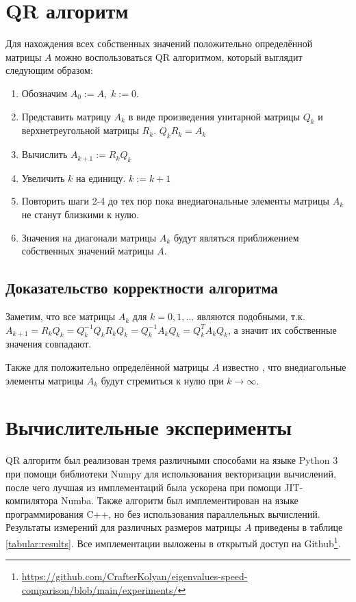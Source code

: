 \documentclass[12pt, fleqn]{article}
\begin{document}
\section{QR алгоритм}

Для нахождения всех собственных значений положительно определённой матрицы $A$ можно воспользоваться QR алгоритмом, который выглядит следующим образом:
\begin{enumerate}
	\item Обозначим $A_0 := A, \; k := 0$.
	\item Представить матрицу $A_k$ в виде произведения унитарной матрицы $Q_k$ и верхнетреугольной матрицы $R_k$. $Q_k R_k = A_k$
	\item Вычислить $A_{k+1} := R_k Q_k$
	\item Увеличить $k$ на единицу. $k := k + 1$
	\item Повторить шаги 2-4 до тех пор пока внедиагональные элементы матрицы $A_k$ не станут близкими к нулю.
	\item Значения на диагонали матрицы $A_k$ будут являться приближением собственных значений матрицы $A$.
\end{enumerate}

\subsection{Доказательство корректности алгоритма}
Заметим, что все матрицы $A_k$ для $k = 0, 1, \dots$ являются подобными, т.к. \\
$A_{k + 1} = R_k Q_k = Q_k^{-1} Q_k R_k Q_k = Q_k^{-1} A_k Q_k = Q_k^T A_k Q_k$, а значит их собственные значения совпадают.

Также для положительно определённой матрицы $A$ известно \cite{QR}, что внедиагольные элементы матрицы $A_k$ будут стремиться к нулю при $k \to \infty$.

\section{Вычислительные эксперименты}

QR алгоритм был реализован тремя различными способами на языке Python 3 при помощи библиотеки Numpy для использования векторизации вычислений, после чего лучшая из имплементаций была ускорена при помощи JIT-компилятора Numba. Также алгоритм был имплементирован на языке программирования C++, но без использования параллельных вычислений. Результаты измерений для различных размеров матрицы $A$ приведены в таблице \ref{tabular:results}. Все имплементации выложены в открытый доступ на Github\footnote{\url{https://github.com/CrafterKolyan/eigenvalues-speed-comparison/blob/main/experiments/}}.
\end{document}
